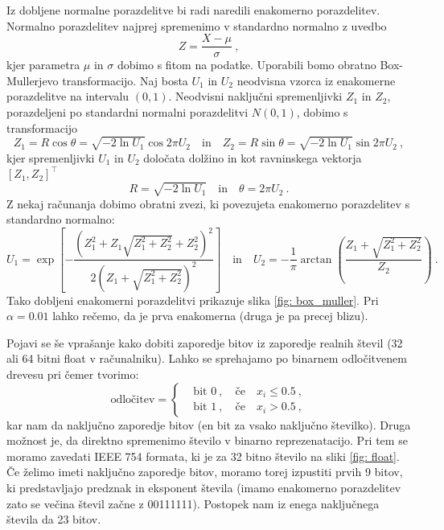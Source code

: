 \documentclass[11pt, oneside]{article}
\theoremstyle{definition}
\begin{document}
Iz dobljene normalne porazdelitve bi radi naredili enakomerno porazdelitev.
Normalno porazdelitev najprej spremenimo v standardno normalno z uvedbo
\begin{equation}
    Z = \frac{X - \mu}{\sigma} \>,
\end{equation}
kjer parametra $\mu$ in $\sigma$ dobimo s fitom na podatke. Uporabili bomo obratno Box-Mullerjevo transformacijo.
Naj bosta $U_1$ in $U_2$ neodvisna vzorca iz enakomerne porazdelitve na intervalu $(0, 1)$.
Neodvisni naključni spremenljivki $Z_1$ in $Z_2$, porazdeljeni po standardni normalni porazdelitvi $N(0, 1)$, dobimo s
transformacijo
\begin{equation}
    Z_1 = R \cos \theta = \sqrt{-2 \ln U_1} \cos 2 \pi U_2 \quad \text{in} \quad
    Z_2 = R \sin \theta = \sqrt{-2 \ln U_1} \sin 2 \pi U_2 \>,
\end{equation}
kjer spremenljivki $U_1$ in $U_2$ določata dolžino in kot ravninskega vektorja $[Z_1, Z_2]^\top$
\begin{equation}
    R = \sqrt{-2 \ln U_1} \quad \text{in} \quad \theta = 2\pi U_2 \>.
\end{equation}
Z nekaj računanja dobimo obratni zvezi, ki povezujeta enakomerno porazdelitev s standardno normalno:
\begin{equation}
    U_1 = \exp\left[{- \frac{\left(Z_1^2 + Z_1 \sqrt{Z_1^2 + Z_2^2} + Z_2^2\right)^2}{2 \left(Z_1 + \sqrt{Z_1^2 + Z_2^2}\right)^2}} \right]
    \quad \text{in} \quad
    U_2 = - \frac{1}{\pi} \arctan \left( \frac{Z_1 + \sqrt{Z_1^2 + Z_2^2}}{Z_2} \right) \>.
\end{equation}
Tako dobljeni enakomerni porazdelitvi prikazuje slika \ref{fig: box_muller}. Pri $\alpha=0.01$ lahko rečemo, da je
prva enakomerna (druga je pa precej blizu).

Pojavi se še vprašanje kako dobiti zaporedje bitov iz zaporedje realnih števil (32 ali 64 bitni float v računalniku).
Lahko se sprehajamo po binarnem odločitvenem drevesu pri čemer tvorimo:
\begin{equation}
    \label{eq: decide}
    \text{odločitev} =
    \begin{cases}
         & \text{bit } 0 \>, \quad \text{če} \quad x_i \leq 0.5 \>, \\
         & \text{bit } 1 \>, \quad \text{če} \quad x_i > 0.5 \>,
    \end{cases}
\end{equation}
kar nam da naključno zaporedje bitov (en bit za vsako naključno številko).
Druga možnost je, da direktno spremenimo število v binarno reprezenatacijo.
Pri tem se moramo zavedati IEEE 754 formata, ki je za 32 bitno število na sliki \ref{fig: float}.
Če želimo imeti naključno zaporedje bitov, moramo torej izpustiti prvih 9 bitov, ki predstavljajo
predznak in eksponent števila (imamo enakomerno porazdelitev zato se večina števil začne z 00111111).
Postopek nam iz enega naključnega števila da 23 bitov.
\end{document}
